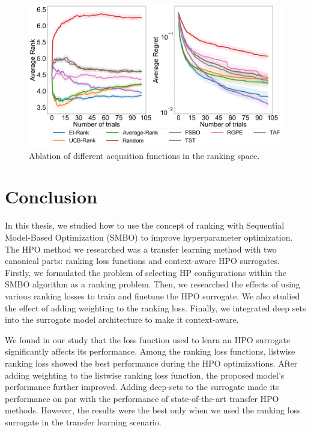 \documentclass[12pt, twoside, ngerman]{report}
\begin{document}
\begin{figure}[h]
  \centering
    \includegraphics[scale=0.22]{images/acqusitionRanking}
    \caption{Ablation of different acqusition functions in the ranking space.}
    \label{fig:acqusitionRanking}
\end{figure}

\chapter{Conclusion}

In this thesis, we studied how to use the concept of ranking with Sequential Model-Based Optimization (SMBO) to improve hyperparameter optimization. The HPO method we researched was a transfer learning method with two canonical parts: ranking loss functions and context-aware HPO surrogates. Firstly, we formulated the problem of selecting HP configurations within the SMBO algorithm as a ranking problem. Then, we researched the effects of using various ranking losses to train and finetune the HPO surrogate. We also studied the effect of adding weighting to the ranking loss. Finally, we integrated deep sets into the surrogate model architecture to make it context-aware.

We found in our study that the loss function used to learn an HPO surrogate significantly affects its performance. Among the ranking loss functions, listwise ranking loss showed the best performance during the HPO optimizations. After adding weighting to the listwise ranking loss function, the proposed model's performance further improved. Adding deep-sets to the surrogate made its performance on par with the performance of state-of-the-art transfer HPO methods. However, the results were the best only when we used the ranking loss surrogate in the transfer learning scenario.
\end{document}
